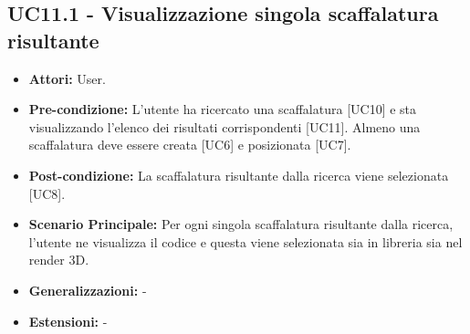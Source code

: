 \subsection{UC11.1 - Visualizzazione singola scaffalatura risultante}
\begin{itemize}
    \item \textbf{Attori:} User.
    \item \textbf{Pre-condizione:} L'utente ha ricercato una scaffalatura [UC10] e sta visualizzando l'elenco dei risultati corrispondenti [UC11]. Almeno una scaffalatura deve essere creata [UC6] e posizionata [UC7].
    \item \textbf{Post-condizione:} La scaffalatura risultante dalla ricerca viene selezionata [UC8].
    \item \textbf{Scenario Principale:} Per ogni singola scaffalatura risultante dalla ricerca, l'utente ne visualizza il codice e questa viene selezionata sia in libreria sia nel render 3D.
    \item \textbf{Generalizzazioni:} -
    \item \textbf{Estensioni:} -
\end{itemize}
